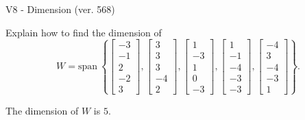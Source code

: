 \begin{exercise}
  \begin{exerciseTitle}V8 - Dimension (ver. 568)\end{exerciseTitle}
  \begin{exerciseStatement}
    Explain how to find the dimension of 
\[W=\mathrm{span}\ \left\{\left[\begin{array}{r}
-3 \\
-1 \\
2 \\
-2 \\
3
\end{array}\right] , \left[\begin{array}{r}
3 \\
3 \\
3 \\
-4 \\
2
\end{array}\right] , \left[\begin{array}{r}
1 \\
-3 \\
1 \\
0 \\
-3
\end{array}\right] , \left[\begin{array}{r}
1 \\
-1 \\
-4 \\
-3 \\
-3
\end{array}\right] , \left[\begin{array}{r}
-4 \\
3 \\
-4 \\
-3 \\
1
\end{array}\right]\right\}.\]



  \end{exerciseStatement}
  \begin{exerciseAnswer}
   The dimension of \(W\) is  \(5\).
  


  \end{exerciseAnswer}
\end{exercise}